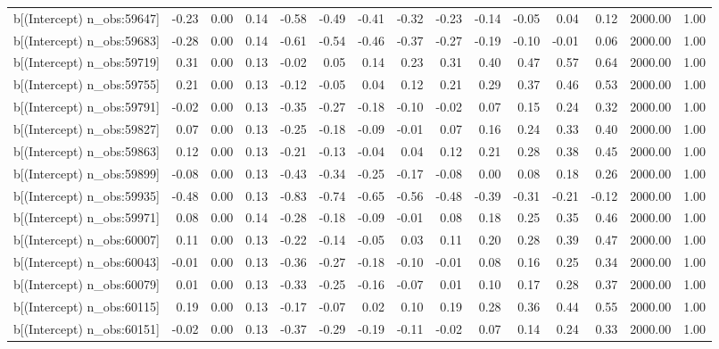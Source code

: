 \begin{table}[ht]
\begin{tabular}{rrrrrrrrrrrrrrr}
  b[(Intercept) n\_obs:59647] & -0.23 & 0.00 & 0.14 & -0.58 & -0.49 & -0.41 & -0.32 & -0.23 & -0.14 & -0.05 & 0.04 & 0.12 & 2000.00 & 1.00 \\ 
  b[(Intercept) n\_obs:59683] & -0.28 & 0.00 & 0.14 & -0.61 & -0.54 & -0.46 & -0.37 & -0.27 & -0.19 & -0.10 & -0.01 & 0.06 & 2000.00 & 1.00 \\ 
  b[(Intercept) n\_obs:59719] & 0.31 & 0.00 & 0.13 & -0.02 & 0.05 & 0.14 & 0.23 & 0.31 & 0.40 & 0.47 & 0.57 & 0.64 & 2000.00 & 1.00 \\ 
  b[(Intercept) n\_obs:59755] & 0.21 & 0.00 & 0.13 & -0.12 & -0.05 & 0.04 & 0.12 & 0.21 & 0.29 & 0.37 & 0.46 & 0.53 & 2000.00 & 1.00 \\ 
  b[(Intercept) n\_obs:59791] & -0.02 & 0.00 & 0.13 & -0.35 & -0.27 & -0.18 & -0.10 & -0.02 & 0.07 & 0.15 & 0.24 & 0.32 & 2000.00 & 1.00 \\ 
  b[(Intercept) n\_obs:59827] & 0.07 & 0.00 & 0.13 & -0.25 & -0.18 & -0.09 & -0.01 & 0.07 & 0.16 & 0.24 & 0.33 & 0.40 & 2000.00 & 1.00 \\ 
  b[(Intercept) n\_obs:59863] & 0.12 & 0.00 & 0.13 & -0.21 & -0.13 & -0.04 & 0.04 & 0.12 & 0.21 & 0.28 & 0.38 & 0.45 & 2000.00 & 1.00 \\ 
  b[(Intercept) n\_obs:59899] & -0.08 & 0.00 & 0.13 & -0.43 & -0.34 & -0.25 & -0.17 & -0.08 & 0.00 & 0.08 & 0.18 & 0.26 & 2000.00 & 1.00 \\ 
  b[(Intercept) n\_obs:59935] & -0.48 & 0.00 & 0.13 & -0.83 & -0.74 & -0.65 & -0.56 & -0.48 & -0.39 & -0.31 & -0.21 & -0.12 & 2000.00 & 1.00 \\ 
  b[(Intercept) n\_obs:59971] & 0.08 & 0.00 & 0.14 & -0.28 & -0.18 & -0.09 & -0.01 & 0.08 & 0.18 & 0.25 & 0.35 & 0.46 & 2000.00 & 1.00 \\ 
  b[(Intercept) n\_obs:60007] & 0.11 & 0.00 & 0.13 & -0.22 & -0.14 & -0.05 & 0.03 & 0.11 & 0.20 & 0.28 & 0.39 & 0.47 & 2000.00 & 1.00 \\ 
  b[(Intercept) n\_obs:60043] & -0.01 & 0.00 & 0.13 & -0.36 & -0.27 & -0.18 & -0.10 & -0.01 & 0.08 & 0.16 & 0.25 & 0.34 & 2000.00 & 1.00 \\ 
  b[(Intercept) n\_obs:60079] & 0.01 & 0.00 & 0.13 & -0.33 & -0.25 & -0.16 & -0.07 & 0.01 & 0.10 & 0.17 & 0.28 & 0.37 & 2000.00 & 1.00 \\ 
  b[(Intercept) n\_obs:60115] & 0.19 & 0.00 & 0.13 & -0.17 & -0.07 & 0.02 & 0.10 & 0.19 & 0.28 & 0.36 & 0.44 & 0.55 & 2000.00 & 1.00 \\ 
  b[(Intercept) n\_obs:60151] & -0.02 & 0.00 & 0.13 & -0.37 & -0.29 & -0.19 & -0.11 & -0.02 & 0.07 & 0.14 & 0.24 & 0.33 & 2000.00 & 1.00 \\ 

\end{tabular}
\end{table}
